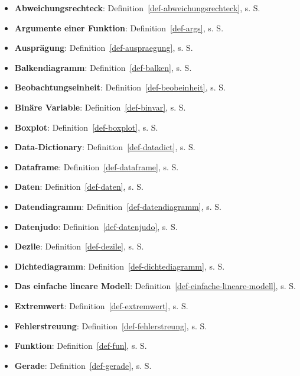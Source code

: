 \documentclass[
  letterpaper,
  twoside,
  open=any]{scrbook}
\providecommand{\tightlist}{%
  \setlength{\itemsep}{0pt}\setlength{\parskip}{0pt}}\usepackage{longtable,booktabs,array}
\theoremstyle{definition}
\theoremstyle{definition}
\theoremstyle{definition}
\theoremstyle{remark}
\begin{document}
\begin{itemize}
\tightlist
\item
  \textbf{Abweichungsrechteck}:
  Definition~\ref{def-abweichungsrechteck}, s. S.
  \pageref{def-abweichungsrechteck}
\item
  \textbf{Argumente einer Funktion}: Definition~\ref{def-args}, s. S.
  \pageref{def-args}
\item
  \textbf{Ausprägung}: Definition~\ref{def-auspraegung}, s. S.
  \pageref{def-auspraegung}
\item
  \textbf{Balkendiagramm}: Definition~\ref{def-balken}, s. S.
  \pageref{def-balken}
\item
  \textbf{Beobachtungseinheit}: Definition~\ref{def-beobeinheit}, s. S.
  \pageref{def-beobeinheit}
\item
  \textbf{Binäre Variable}: Definition~\ref{def-binvar}, s. S.
  \pageref{def-binvar}
\item
  \textbf{Boxplot}: Definition~\ref{def-boxplot}, s. S.
  \pageref{def-boxplot}
\item
  \textbf{Data-Dictionary}: Definition~\ref{def-datadict}, s. S.
  \pageref{def-datadict}
\item
  \textbf{Dataframe}: Definition~\ref{def-dataframe}, s. S.
  \pageref{def-dataframe}
\item
  \textbf{Daten}: Definition~\ref{def-daten}, s. S. \pageref{def-daten}
\item
  \textbf{Datendiagramm}: Definition~\ref{def-datendiagramm}, s. S.
  \pageref{def-datendiagramm}
\item
  \textbf{Datenjudo}: Definition~\ref{def-datenjudo}, s. S.
  \pageref{def-datenjudo}
\item
  \textbf{Dezile}: Definition~\ref{def-dezile}, s. S.
  \pageref{def-dezile}
\item
  \textbf{Dichtediagramm}: Definition~\ref{def-dichtediagramm}, s. S.
  \pageref{def-dichtediagramm}
\item
  \textbf{Das einfache lineare Modell}:
  Definition~\ref{def-einfache-lineare-modell}, s. S.
  \pageref{def-einfache-lineare-modell}
\item
  \textbf{Extremwert}: Definition~\ref{def-extremwert}, s. S.
  \pageref{def-extremwert}
\item
  \textbf{Fehlerstreuung}: Definition~\ref{def-fehlerstreung}, s. S.
  \pageref{def-fehlerstreung}
\item
  \textbf{Funktion}: Definition~\ref{def-fun}, s. S. \pageref{def-fun}
\item
  \textbf{Gerade}: Definition~\ref{def-gerade}, s. S.

\end{itemize}
\end{document}
